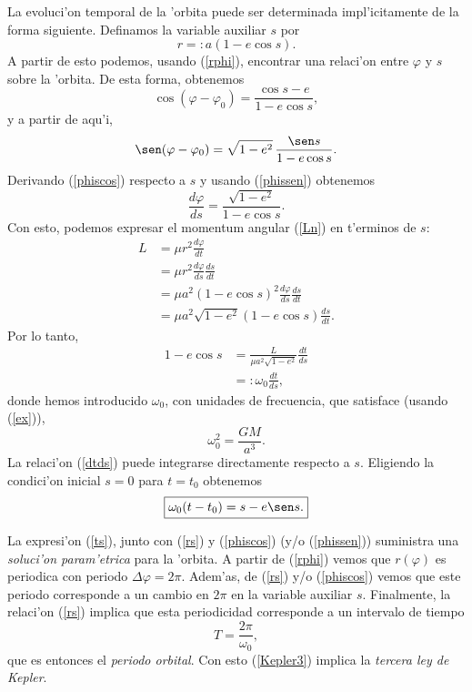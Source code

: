 La evoluci'on temporal de la 'orbita puede ser determinada impl'icitamente de la forma siguiente. Definamos la variable auxiliar $s$ por
\begin{equation}\label{rs}
\boxed{r=:a(1-e\cos s).}
\end{equation}
A partir de esto podemos, usando (\ref{rphi}), encontrar una relaci'on entre $\varphi$ y $s$ sobre la 'orbita. De esta forma, obtenemos
\begin{equation}\label{phiscos}
\boxed{\cos(\varphi-\varphi_0)=\frac{\cos s -e}{1-e\cos s}, }
\end{equation}
y a partir de aqu'i,
\begin{equation}\label{phissen}
\sen(\varphi-\varphi_0)=\sqrt{1-e^2}\,\frac{\sen s}{1-e\cos s}.
\end{equation}
Derivando (\ref{phiscos}) respecto a $s$ y usando (\ref{phissen}) obtenemos
\begin{equation}
\frac{d\varphi}{ds}=\frac{\sqrt{1-e^2}}{1-e\cos s}.
\end{equation}
Con esto, podemos expresar el momentum angular (\ref{Ln}) en t'erminos de $s$:
\begin{align}
L & = \mu r^2 \frac{d\varphi}{dt} \\
& = \mu r^2 \frac{d\varphi}{ds}\frac{ds}{dt} \\
& = \mu a^2\left(1-e\cos s\right)^2 \frac{d\varphi}{ds}\frac{ds}{dt} \\
& = \mu a^2\sqrt{1-e^2}\left(1-e\cos s\right) \frac{ds}{dt} .
\end{align}
Por lo tanto,
\begin{align}
1-e\cos s & = \frac{L}{\mu a^2\sqrt{1-e^2}} \frac{dt}{ds} \\
& =: \omega_0 \frac{dt}{ds}, \label{dtds}
\end{align}
donde hemos introducido $\omega_0$, con unidades de frecuencia, que satisface (usando (\ref{ex})),
\begin{equation}\label{Kepler3}
\boxed{\omega_0^2=\frac{GM}{a^3}.}
\end{equation}
La relaci'on (\ref{dtds}) puede integrarse directamente respecto a $s$. Eligiendo la condici'on inicial $s=0$ para $t=t_0$ obtenemos
\begin{equation}\label{ts}
\boxed{\omega_0(t-t_0)=s-e\sen s.}
\end{equation}

La expresi'on (\ref{ts}), junto con (\ref{rs}) y (\ref{phiscos}) (y/o (\ref{phissen})) suministra una \textit{soluci'on param'etrica} para la 'orbita.
A partir de (\ref{rphi}) vemos que $r(\varphi)$ es periodica con periodo $\Delta\varphi=2\pi$. Adem'as, de (\ref{rs}) y/o (\ref{phiscos}) vemos que este periodo corresponde a un cambio en $2\pi$ en la variable auxiliar $s$. Finalmente, la relaci'on (\ref{rs}) implica que esta periodicidad corresponde a un intervalo de tiempo
\begin{equation}
T=\frac{2\pi}{\omega_0},
\end{equation}
que es entonces el \textit{periodo orbital}. Con esto (\ref{Kepler3}) implica la \textit{tercera ley de Kepler}.

